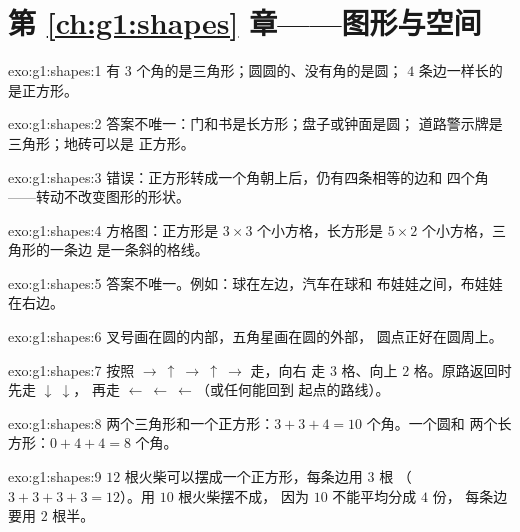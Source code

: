 \section*{第 \ref{ch:g1:shapes} 章——图形与空间}

\begin{solution}{exo:g1:shapes:1}
有 $3$ 个角的是三角形；圆圆的、没有角的是圆；
$4$ 条边一样长的是正方形。
\end{solution}

\begin{solution}{exo:g1:shapes:2}
答案不唯一：门和书是长方形；盘子或钟面是圆；
道路警示牌是三角形；地砖可以是
正方形。
\end{solution}

\begin{solution}{exo:g1:shapes:3}
错误：正方形转成一个角朝上后，仍有四条相等的边和
四个角——转动不改变图形的形状。
\end{solution}

\begin{solution}{exo:g1:shapes:4}
方格图：正方形是 $3 \times 3$ 个小方格，长方形是
$5 \times 2$ 个小方格，三角形的一条边
是一条斜的格线。
\end{solution}

\begin{solution}{exo:g1:shapes:5}
答案不唯一。例如：球在左边，汽车在球和
布娃娃之间，布娃娃在右边。
\end{solution}

\begin{solution}{exo:g1:shapes:6}
叉号画在圆的内部，五角星画在圆的外部，
圆点正好在圆周上。
\end{solution}

\begin{solution}{exo:g1:shapes:7}
按照 $\to\ \uparrow\ \to\ \uparrow\ \to$ 走，向右
走 $3$ 格、向上 $2$ 格。原路返回时先走 $\downarrow\ \downarrow$，
再走 $\leftarrow\ \leftarrow\ \leftarrow$（或任何能回到
起点的路线）。
\end{solution}

\begin{solution}{exo:g1:shapes:8}
两个三角形和一个正方形：$3 + 3 + 4 = 10$ 个角。一个圆和
两个长方形：$0 + 4 + 4 = 8$ 个角。
\end{solution}

\begin{solution}{exo:g1:shapes:9}
$12$ 根火柴可以摆成一个正方形，每条边用 $3$ 根
（$3 + 3 + 3 + 3 = 12$）。用 $10$ 根火柴摆不成，
因为 $10$ 不能平均分成 $4$ 份，
每条边要用 $2$ 根半。
\end{solution}
